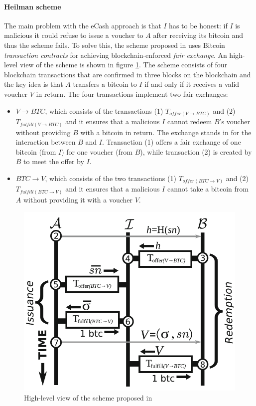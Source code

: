 \paragraph{Heilman scheme} The main problem with the eCash approach is that $I$
has to be honest: if $I$ is malicious it could refuse to issue a voucher to $A$
after receiving its bitcoin and thus the scheme fails. To solve this, the scheme
proposed in \cite{heilman-blindly-signed-contracts} uses Bitcoin
\emph{transaction contracts} for achieving blockchain-enforced \emph{fair
exchange}. An high-level view of the scheme is shown in figure
\ref{fig:heilman-scheme}. The scheme consists of four blockchain transactions
that are confirmed in three blocks on the blockchain and the key idea is that
$A$ transfers a bitcoin to $I$ if and only if it receives a valid voucher $V$ in
return. The four transactions implement two fair exchanges:
\begin{itemize}
  \item $V\rightarrow BTC$, which consists of the transactions (1) $T_{offer(V\rightarrow
  BTC)}$ and (2) $T_{fulfill(V\rightarrow BTC)}$ and it ensures that a malicious $I$
  cannot redeem $B$’s voucher without providing $B$ with a bitcoin in return.
  The exchange stands in for the interaction between $B$ and $I$.
  Transaction (1) offers a fair exchange of one bitcoin (from $I$) for
  one voucher (from $B$), while transaction (2) is created by $B$ to meet
  the offer by $I$.
  \item $BTC\rightarrow V$, which consists of the two transactions (1) $T_{offer(BTC\rightarrow
  V)}$ and (2) $T_{fulfill(BTC\rightarrow V)}$ and it ensures that a malicious $I$
  cannot take a bitcoin from $A$ without providing it with a voucher $V$.
\end{itemize}


\begin{figure}[!htb]
	\centering
	\includegraphics[width=0.6\linewidth]{img/heilman-scheme.png}
	\caption{High-level view of the scheme proposed in \cite{heilman-blindly-signed-contracts}}
	\label{fig:heilman-scheme}
\end{figure}

